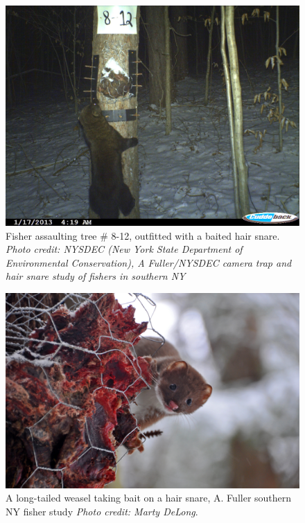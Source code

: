 \begin{figure}[h!]
\centering
\includegraphics[width=\textwidth]{Ch20-Last/fisher.jpg}
\caption{
Fisher assaulting tree \# 8-12, outfitted with a baited hair snare.
{\it Photo credit: NYSDEC (New York State Department of Environmental Conservation),
A Fuller/NYSDEC camera trap and hair snare study of fishers in
southern NY}
}
\label{last.fig.fisher}
\end{figure}

\begin{figure}[h!]
\centering
\includegraphics[width=\textwidth]{Ch20-Last/weasel.jpg}
\caption{
A long-tailed weasel taking bait on a hair snare, A. Fuller southern NY fisher study
{\it Photo credit: Marty DeLong}.
}
\label{last.fig.weasels}
\end{figure}



